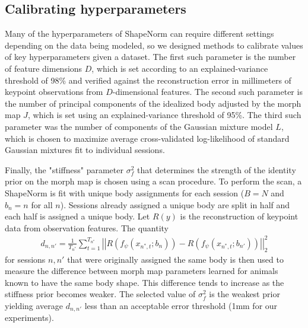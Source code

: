\documentclass{article}         %
\begin{document}
\subsection{Calibrating hyperparameters}
\label{sec:hypers}

Many of the hyperparameters of ShapeNorm can require different settings depending on the data being modeled, so we designed methods to calibrate values of key hyperparameters given a dataset. The first such parameter is the number of feature dimensions $D$, which is set according to an explained-variance threshold of 98\% and verified against the reconstruction error in millimeters of keypoint observations from $D$-dimensional features. The second such parameter is the number of principal components of the idealized body adjusted by the morph map $J$, which is set using an explained-variance threshold of 95\%. The third such parameter was the number of components of the Gaussian mixture model $L$, which is chosen to maximize average cross-validated log-likelihood of standard Gaussian mixtures fit to individual sessions.

Finally, the "stiffness" parameter $\sigma_f^2$ that determines the strength of the identity prior on the morph map is chosen using a scan procedure. To perform the scan, a ShapeNorm is fit with unique body assignments for each session ($B = N$ and $b_n = n$ for all $n$). Sessions already assigned a unique body are split in half and each half is assigned a unique body. Let $R(y)$ is the reconstruction of keypoint data from observation features. The quantity
\begin{align*}
    d_{n,n'} = \frac{1}{T_{n^*}}\sum_{t=1}^{T_{n^*}} \left|\left| R(f_\psi(x_{n^*, t}; b_n)) - R(f_\psi(x_{n^*, t}; b_{n'})) \right|\right|_2^2
\end{align*}
for sessions $n, n'$ that were originally assigned the same body is then used to measure the difference between morph map parameters learned for animals known to have the same body shape. This difference tends to increase as the stiffness prior becomes weaker. The selected value of $\sigma_f^2$ is the weakest prior yielding average $d_{n, n'}$ less than an acceptable error threshold (1mm for our experiments).
\end{document}
